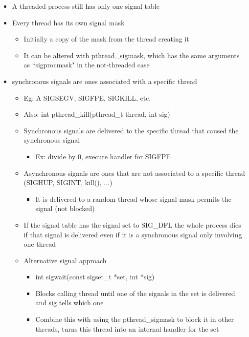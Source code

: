 \begin{itemize}
    \item A threaded process still has only one signal table
    \item Every thread has its own signal mask
    \begin{itemize}
        \item Initially a copy of the mask from the thread creating it
        \item It can be altered with pthread\_sigmask, which has the same arguments as ``sigprocmask" in the not-threaded case
    \end{itemize}
    \item synchronous signals are ones associated with a specific thread
    \begin{itemize}
        \item Eg: A SIGSEGV, SIGFPE, SIGKILL, etc.
        \item Also: int pthread\_kill(pthread\_t thread, int sig)
        \item Synchronous signals are delivered to the specific thread that caused the synchronous signal
        \begin{itemize}
            \item Ex: divide by 0, execute handler for SIGFPE
        \end{itemize}
        \item Asynchronous signals are ones that are not associated to a specific thread (SIGHUP, SIGINT, kill(), ...)
        \begin{itemize}
            \item It is delivered to a random thread whose signal mask permits the signal (not blocked)
        \end{itemize}
        \item If the signal table has the signal set to SIG\_DFL the whole process dies if that signal is delivered even if it is a synchronous signal only involving one thread
        \item Alternative signal approach
        \begin{itemize}
            \item int sigwait(const sigset\_t *set, int *sig)
            \item Blocks calling thread until one of the signals in the set is delivered and sig tells which one
            \item Combine this with using the pthread\_sigmask to block it in other threads, turns this thread into an internal handler for the set
        \end{itemize}
    \end{itemize}
\end{itemize}